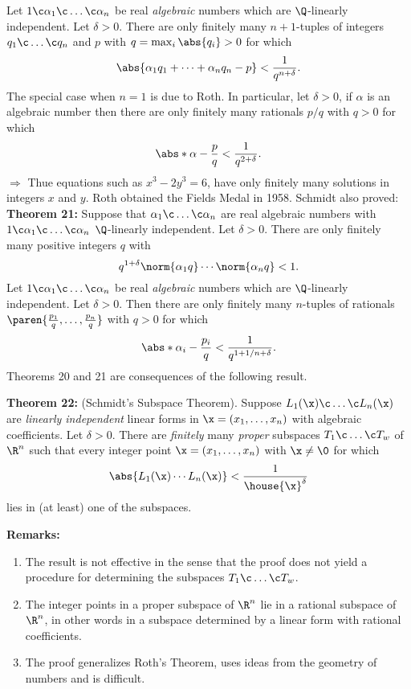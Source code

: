 \cor Let $1\c \alpha_1\c \dotsc\c \alpha_n$ be real \emph{algebraic} numbers which are $\Q$-linearly independent.  Let $\delta>0$.  There are only finitely many $n+1$-tuples of integers $q_1\c \dotsc\c q_n$ and $p$ with $q=\max_i\abs{q_i}>0$ for which
\[ \abs{\alpha_1q_1+\dotsb+\alpha_nq_n-p}<\frac{1}{q^{n+\delta}} . \]
The special case when $n=1$ is due to Roth.  In particular, let $\delta>0$, if $\alpha$ is an algebraic number then there are only finitely many rationals $p/q$ with $q>0$ for which
\[ \abs*{\alpha-\frac{p}{q}} < \frac{1}{q^{2+\delta}} . \]
$\Longrightarrow$ Thue equations such as $x^3-2y^3=6$, have only finitely many solutions in integers $x$ and $y$.  Roth obtained the Fields Medal in 1958.  Schmidt also proved: \\
\textbf{Theorem 21:} Suppose that $\alpha_1\c \dotsc\c \alpha_n$ are real algebraic numbers with $1\c \alpha_1\c \dotsc\c \alpha_n$ $\Q$-linearly independent.  Let $\delta>0$.  There are only finitely many positive integers $q$ with
\[ q^{1+\delta}\norm{\alpha_1q}\dotsm\norm{\alpha_nq} < 1 . \]
\cor Let $1\c \alpha_1\c \dotsc\c \alpha_n$ be real \emph{algebraic} numbers which are $\Q$-linearly independent.  Let $\delta>0$.  Then there are only finitely many $n$-tuples of rationals $\paren{\frac{p_1}{q},\dotsc,\frac{p_n}{q}}$ with $q>0$ for which
\[ \abs*{\alpha_i-\frac{p_i}{q}} < \frac{1}{q^{1+1/n+\delta}} . \]
Theorems 20 and 21 are consequences of the following result.

\textbf{Theorem 22:} (Schmidt's Subspace Theorem).  Suppose $L_1(\x)\c \dotsc\c L_n(\x)$ are \emph{linearly independent} linear forms in $\x=(x_1,\dotsc,x_n)$ with algebraic coefficients.  Let $\delta>0$.  There are \emph{finitely} many \emph{proper} subspaces $T_1\c \dotsc\c T_w$ of $\R^n$ such that every integer point $\x=(x_1,\dotsc,x_n)$ with $\x\neq\0$ for which%
\[ \abs{L_1(\x)\dotsm L_n(\x)} < \frac{1}{\house{\x}^\delta} \]
lies in (at least) one of the subspaces.

\pagebreak
\textbf{Remarks:}\begin{enumerate}
\item The result is not effective in the sense that the proof does not yield a procedure for determining the subspaces $T_1\c \dotsc\c T_w$.
\item The integer points in a proper subspace of $\R^n$ lie in a rational subspace of $\R^n$, in other words in a subspace determined by a linear form with rational coefficients.
\item The proof generalizes Roth's Theorem, uses ideas from the geometry of numbers and is difficult.
\end{enumerate}

